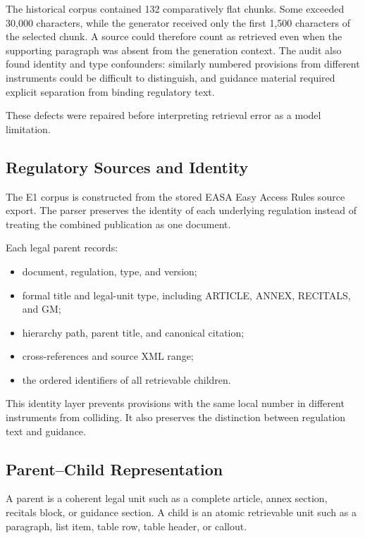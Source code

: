 The historical corpus contained 132 comparatively flat chunks. Some exceeded 30,000 characters, while the generator received only the first 1,500 characters of the selected chunk. A source could therefore count as retrieved even when the supporting paragraph was absent from the generation context. The audit also found identity and type confounders: similarly numbered provisions from different instruments could be difficult to distinguish, and guidance material required explicit separation from binding regulatory text.

These defects were repaired before interpreting retrieval error as a model limitation.

\subsection{Regulatory Sources and Identity}

The E1 corpus is constructed from the stored EASA Easy Access Rules source export. The parser preserves the identity of each underlying regulation instead of treating the combined publication as one document.

Each legal parent records:

\begin{itemize}
  \item document, regulation, type, and version;
  \item formal title and legal-unit type, including ARTICLE, ANNEX, RECITALS, and GM;
  \item hierarchy path, parent title, and canonical citation;
  \item cross-references and source XML range;
  \item the ordered identifiers of all retrievable children.
\end{itemize}

This identity layer prevents provisions with the same local number in different instruments from colliding. It also preserves the distinction between regulation text and guidance.

\subsection{Parent--Child Representation}

A parent is a coherent legal unit such as a complete article, annex section, recitals block, or guidance section. A child is an atomic retrievable unit such as a paragraph, list item, table row, table header, or callout.

